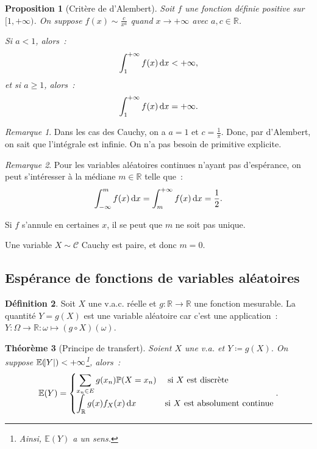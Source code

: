 \documentclass{article}
\newcommand{\E}{\mathbb E}
\renewcommand{\P}{\mathbb P}
\newcommand{\R}{\mathbb R}
\newtheorem{thm}{Théorème}[section]
\newtheorem{prp}[thm]{Proposition}
\theoremstyle{definition}
\newtheorem{déf}[thm]{Définition}
\theoremstyle{remark}
\newtheorem*{rmq}{Remarque}
\begin{document}
		\begin{prp}[Critère de d'Alembert] Soit $f$ une fonction définie positive sur $[1, +\infty)$. On suppose $f(x) \sim \frac c{x^a}$ quand $x \to +\infty$
		avec $a, c \in \R$.

		Si $a < 1$, alors~:
		\[\int_1^{+\infty}f(x)\dif x < +\infty,\]
		et si $a \geq 1$, alors~:
		\[\int_1^{+\infty}f(x)\dif x = +\infty.\]
		\end{prp}

		\begin{rmq} Dans les cas des Cauchy, on a $a=1$ et $c = \frac 1\pi$. Donc, par d'Alembert, on sait que l'intégrale est infinie. On n'a pas besoin de
		primitive explicite. \end{rmq}

		\begin{rmq} Pour les variables aléatoires continues n'ayant pas d'espérance, on peut s'intéresser à la médiane $m \in \R$ telle que~:
		\[\int_{-\infty}^mf(x)\dif x = \int_m^{+\infty}f(x)\dif x = \frac 12.\]

		Si $f$ s'annule en certaines $x$, il se peut que $m$ ne soit pas unique.

		Une variable $X \sim \mathcal C$ Cauchy est paire, et donc $m = 0$.
		\end{rmq}

	\subsection{Espérance de fonctions de variables aléatoires}
		\begin{déf} Soit $X$ une v.a.c. réelle et $g : \R \to \R$ une fonction mesurable. La quantité $Y = g(X)$ est une variable aléatoire car c'est une
		application~: $Y : \Omega \to \R : \omega \mapsto (g \circ X)(\omega)$. \end{déf}

		\begin{thm}[Principe de transfert] Soient $X$ une v.a. et $Y \coloneqq g(X)$. On suppose $\E(\abs Y) < +\infty$\footnote{Ainsi, $\E(Y)$ a un sens.},
		alors~:
		\begin{equation}
			\E(Y) =
				\begin{cases}
					\displaystyle \sum_{x_n \in E}g(x_n)\P(X = x_n) &\text{ si $X$ est discrète} \\
					\displaystyle \int_\R g(x)f_X(x)\dif x &\text{si $X$ est absolument continue}
				\end{cases}.
		\end{equation}
		\end{thm}
\end{document}
